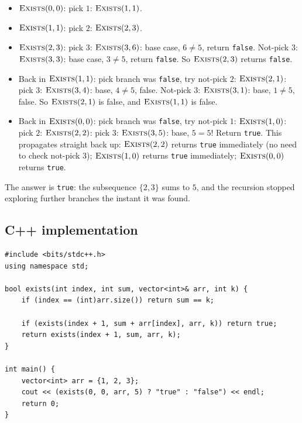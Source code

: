 \begin{itemize}
  \item $\textsc{Exists}(0,0)$: pick $1$: $\textsc{Exists}(1,1)$.
  \item $\textsc{Exists}(1,1)$: pick $2$: $\textsc{Exists}(2,3)$.
  \item $\textsc{Exists}(2,3)$: pick $3$: $\textsc{Exists}(3,6)$: base
        case, $6 \ne 5$, return \texttt{false}. Not-pick $3$:
        $\textsc{Exists}(3,3)$: base case, $3 \ne 5$, return
        \texttt{false}. So $\textsc{Exists}(2,3)$ returns
        \texttt{false}.
  \item Back in $\textsc{Exists}(1,1)$: pick branch was \texttt{false},
        try not-pick $2$: $\textsc{Exists}(2,1)$: pick $3$:
        $\textsc{Exists}(3,4)$: base, $4 \ne 5$, false. Not-pick $3$:
        $\textsc{Exists}(3,1)$: base, $1\ne5$, false. So
        $\textsc{Exists}(2,1)$ is false, and $\textsc{Exists}(1,1)$ is
        false.
  \item Back in $\textsc{Exists}(0,0)$: pick branch was \texttt{false},
        try not-pick $1$: $\textsc{Exists}(1,0)$: pick $2$:
        $\textsc{Exists}(2,2)$: pick $3$: $\textsc{Exists}(3,5)$: base,
        $5=5$! Return \texttt{true}. This propagates straight back up:
        $\textsc{Exists}(2,2)$ returns \texttt{true} immediately (no
        need to check not-pick $3$); $\textsc{Exists}(1,0)$ returns
        \texttt{true} immediately; $\textsc{Exists}(0,0)$ returns
        \texttt{true}.
\end{itemize}

The answer is \texttt{true}: the subsequence $\{2,3\}$ sums to $5$, and
the recursion stopped exploring further branches the instant it was
found.

\subsection*{C++ implementation}

\begin{lstlisting}
#include <bits/stdc++.h>
using namespace std;

bool exists(int index, int sum, vector<int>& arr, int k) {
    if (index == (int)arr.size()) return sum == k;

    if (exists(index + 1, sum + arr[index], arr, k)) return true;
    return exists(index + 1, sum, arr, k);
}

int main() {
    vector<int> arr = {1, 2, 3};
    cout << (exists(0, 0, arr, 5) ? "true" : "false") << endl;
    return 0;
}
\end{lstlisting}

